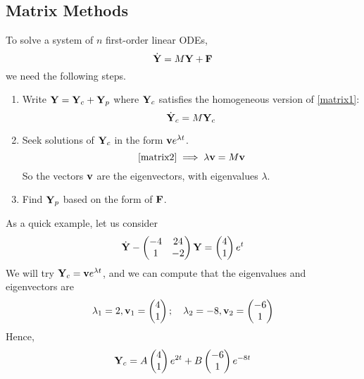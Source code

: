 \documentclass{article}
\begin{document}
\subsection{Matrix Methods}
To solve a system of $n$ first-order linear ODEs,
\begin{equation}\label{matrix1}
    \dot {\vb Y} = M\vb Y + \vb F
\end{equation}
we need the following steps.
\begin{enumerate}
    \item Write $\vb Y = \vb Y_c + \vb Y_p$ where $\vb Y_c$ satisfies the homogeneous version of \eqref{matrix1}:
          \begin{equation}\label{matrix2}
              \dot {\vb Y}_c = M\vb Y_c
          \end{equation}
    \item Seek solutions of $\vb Y_c$ in the form $\vb v e^{\lambda t}$.
          \[ \eqref{matrix2} \implies \lambda \vb v = M\vb v \]
          So the vectors $\vb v$ are the eigenvectors, with eigenvalues $\lambda$.
    \item Find $\vb Y_p$ based on the form of $\vb F$.
\end{enumerate}
As a quick example, let us consider
\begin{equation}\label{matrixexample}
    \dot {\vb Y} - \begin{pmatrix}
        -4 & 24 \\ 1 & -2
    \end{pmatrix}\vb Y = \begin{pmatrix}
        4 \\ 1
    \end{pmatrix}e^t
\end{equation}
We will try $\vb Y_c = \vb v e^{\lambda t}$, and we can compute that the eigenvalues and eigenvectors are
\[ \lambda_1 = 2, \vb v_1 = \begin{pmatrix}
        4 \\ 1
    \end{pmatrix};\quad \lambda_2 = -8, \vb v_2 = \begin{pmatrix}
        -6 \\ 1
    \end{pmatrix} \]
Hence,
\[ \vb Y_c = A\begin{pmatrix}
        4 \\ 1
    \end{pmatrix}e^{2t} + B\begin{pmatrix}
        -6 \\ 1
    \end{pmatrix}e^{-8t} \]
\end{document}
